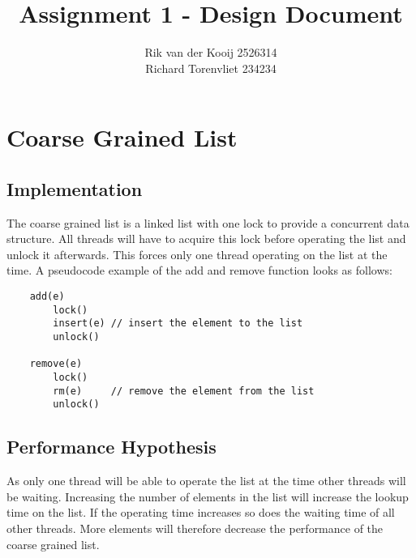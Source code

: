 \documentclass[10pt,a4paper]{article}
\author{Rik van der Kooij 2526314\\Richard Torenvliet 234234}
\title{Assignment 1 - Design Document}
\begin{document}
\maketitle



\section{Coarse Grained List}
\subsection{Implementation}
    The coarse grained list is a linked list with one lock to provide a concurrent data structure. All threads will have to acquire this lock before operating the list and unlock it afterwards. This forces only one thread operating on the list at the time. A pseudocode example of the add and remove function looks as follows:
   
\begin{lstlisting}
    add(e) 
        lock()
        insert(e) // insert the element to the list
        unlock()

    remove(e)
        lock()
        rm(e)     // remove the element from the list
        unlock()
\end{lstlisting}

\subsection{Performance Hypothesis}
As only one thread will be able to operate the list at the time other threads will be waiting. Increasing the number of elements in the list will increase the lookup time on the list. If the operating time increases so does the waiting time of all other threads. More elements will therefore decrease the performance of the coarse grained list.
\end{document}
